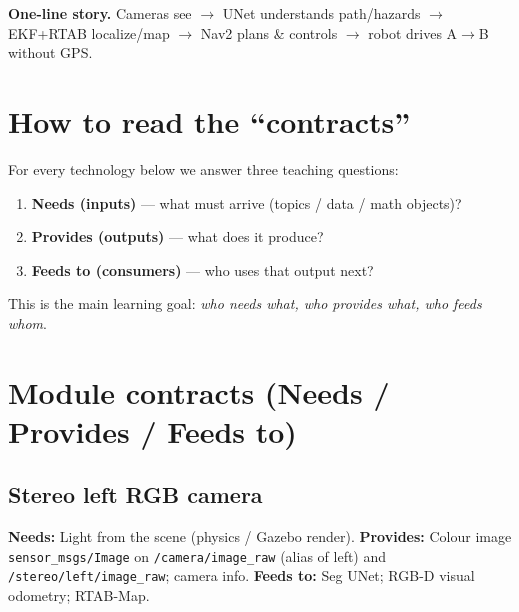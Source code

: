 \documentclass[11pt,a4paper]{article}
\newcommand{\needs}[1]{\textbf{Needs:} #1}
\newcommand{\provides}[1]{\textbf{Provides:} #1}
\newcommand{\feeds}[1]{\textbf{Feeds to:} #1}
\begin{document}
\begin{center}
\end{center}

\noindent\textbf{One-line story.}
Cameras see $\rightarrow$ UNet understands path/hazards $\rightarrow$ EKF+RTAB localize/map $\rightarrow$ Nav2 plans \& controls $\rightarrow$ robot drives A$\rightarrow$B without GPS.

\section{How to read the ``contracts''}

For every technology below we answer three teaching questions:
\begin{enumerate}[leftmargin=*]
  \item \textbf{Needs (inputs)} --- what must arrive (topics / data / math objects)?
  \item \textbf{Provides (outputs)} --- what does it produce?
  \item \textbf{Feeds to (consumers)} --- who uses that output next?
\end{enumerate}
This is the main learning goal: \emph{who needs what, who provides what, who feeds whom}.

\section{Module contracts (Needs / Provides / Feeds to)}

\subsection{Stereo left RGB camera}
\needs{Light from the scene (physics / Gazebo render).}
\provides{Colour image \texttt{sensor\_msgs/Image} on \texttt{/camera/image\_raw} (alias of left) and \texttt{/stereo/left/image\_raw}; camera info.}
\feeds{Seg UNet; RGB-D visual odometry; RTAB-Map.}
\end{document}
